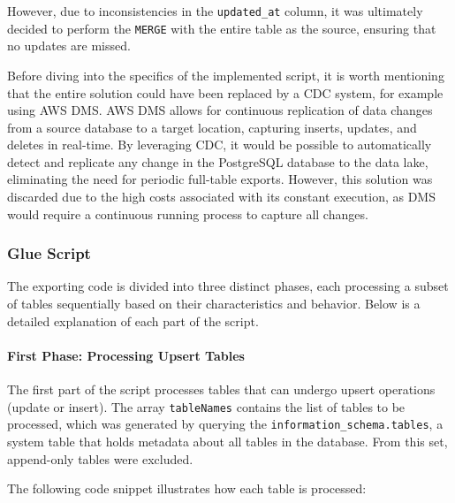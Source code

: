 However, due to inconsistencies in the \texttt{updated\_at} column, it was ultimately decided to perform the \texttt{MERGE} with the entire table as the source, ensuring that no updates are missed.

Before diving into the specifics of the implemented script, it is worth mentioning that the entire solution could have been replaced by a \ac{CDC} system, for example using AWS \ac{DMS}. AWS DMS allows for continuous replication of data changes from a source database to a target location, capturing inserts, updates, and deletes in real-time. By leveraging CDC, it would be possible to automatically detect and replicate any change in the PostgreSQL database to the data lake, eliminating the need for periodic full-table exports. However, this solution was discarded due to the high costs associated with its constant execution, as DMS would require a continuous running process to capture all changes.

\subsubsection{Glue Script}

The exporting code is divided into three distinct phases, each processing a subset of tables sequentially based on their characteristics and behavior. Below is a detailed explanation of each part of the script.

\paragraph{First Phase: Processing Upsert Tables}

The first part of the script processes tables that can undergo upsert operations (update or insert). The array \texttt{tableNames} contains the list of tables to be processed, which was generated by querying the \texttt{information\_schema.tables}, a system table that holds metadata about all tables in the database. From this set, append-only tables were excluded.

The following code snippet illustrates how each table is processed:

